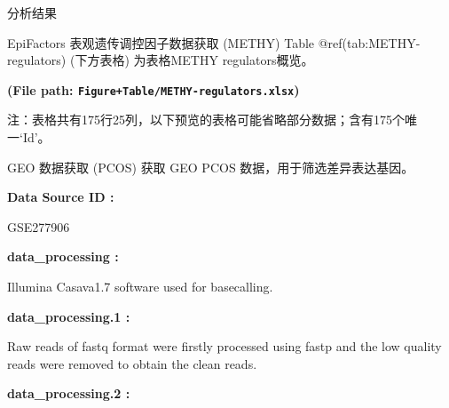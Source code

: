 \documentclass[
  ignorenonframetext,
]{beamer}
\begin{document}
\begin{frame}[fragile]{分析结果}
\begin{block}{EpiFactors 表观遗传调控因子数据获取 (METHY)}
Table @ref(tab:METHY-regulators) (下方表格) 为表格METHY regulators概览。

\textbf{(File path: \texttt{Figure+Table/METHY-regulators.xlsx})}

\begin{center}\begin{tcolorbox}[colback=gray!10, colframe=gray!50, width=0.9\linewidth, arc=1mm, boxrule=0.5pt]注：表格共有175行25列，以下预览的表格可能省略部分数据；含有175个唯一`Id'。
\end{tcolorbox}
\end{center}

\begin{center}\vspace{1.5cm}\end{center}
\end{block}

\begin{block}{GEO 数据获取 (PCOS)}
\protect\hypertarget{geo-ux6570ux636eux83b7ux53d6-pcos}{}
获取 GEO PCOS 数据，用于筛选差异表达基因。

\begin{center}\begin{tcolorbox}[colback=gray!10, colframe=gray!50, width=0.9\linewidth, arc=1mm, boxrule=0.5pt]
\textbf{
Data Source ID
:}

\vspace{0.5em}

    GSE277906

\vspace{2em}


\textbf{
data\_processing
:}

\vspace{0.5em}

    Illumina Casava1.7 software used for basecalling.

\vspace{2em}


\textbf{
data\_processing.1
:}

\vspace{0.5em}

    Raw reads of fastq format were firstly processed using
fastp and the low quality reads were removed to obtain the
clean reads.

\vspace{2em}


\textbf{
data\_processing.2
:}

\vspace{0.5em}


\end{tcolorbox}
\end{center}
\end{block}
\end{frame}
\end{document}
